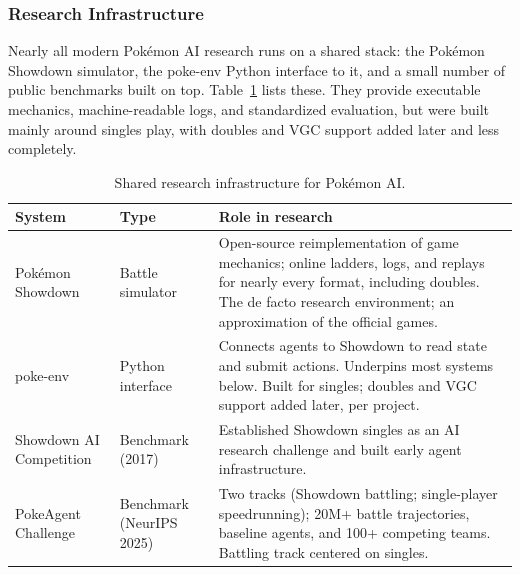 \subsubsection{Research Infrastructure}
\label{subsec:infrastructure}

Nearly all modern Pok\'{e}mon AI research runs on a shared stack: the Pok\'{e}mon
Showdown simulator, the poke-env Python interface to it, and a small number of
public benchmarks built on top. Table~\ref{tab:infrastructure} lists these. They
provide executable mechanics, machine-readable logs, and standardized evaluation,
but were built mainly around singles play, with doubles and VGC support added
later and less completely.

\begin{table}[ht]
\small
\tablespacing
\begin{tabularx}{\textwidth}{@{}>{\hsize=0.85\hsize\raggedright\arraybackslash}X
                                >{\hsize=0.75\hsize\raggedright\arraybackslash}X
                                >{\hsize=1.40\hsize\raggedright\arraybackslash}X@{}}
\toprule
\textbf{System} & \textbf{Type} & \textbf{Role in research} \\
\midrule
Pok\'{e}mon Showdown \cite{pokemon_showdown}
  & Battle simulator
  & Open-source reimplementation of game mechanics; online ladders, logs, and
    replays for nearly every format, including doubles. The de facto research
    environment; an approximation of the official games. \\
\addlinespace
poke-env \cite{poke_env}
  & Python interface
  & Connects agents to Showdown to read state and submit actions. Underpins most
    systems below. Built for singles; doubles and VGC support added later, per
    project. \\
\addlinespace
Showdown AI Competition \cite{lee2017showdown}
  & Benchmark (2017)
  & Established Showdown singles as an AI research challenge and built early
    agent infrastructure. \\
\addlinespace
PokeAgent Challenge \cite{karten2025pokeagent}
  & Benchmark (NeurIPS 2025)
  & Two tracks (Showdown battling; single-player speedrunning); 20M+ battle
    trajectories, baseline agents, and 100+ competing teams. Battling track
    centered on singles. \\
\bottomrule
\end{tabularx}
\caption{Shared research infrastructure for Pok\'{e}mon AI.}
\label{tab:infrastructure}
\end{table}

